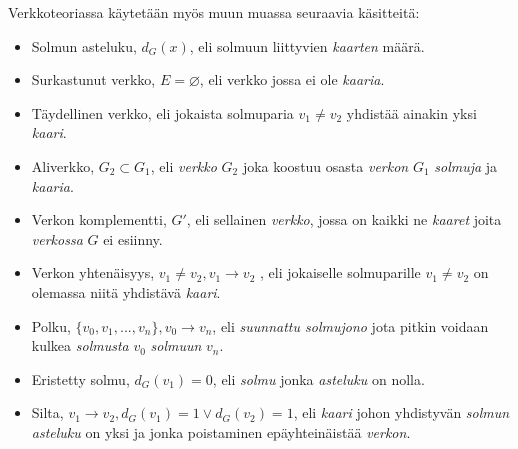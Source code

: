 Verkkoteoriassa käytetään myös muun muassa seuraavia käsitteitä:
\begin{itemize}
  \item Solmun asteluku, \(d_G(x)\), eli solmuun liittyvien \emph{kaarten} määrä.
  \item Surkastunut verkko, \(E = \varnothing \), eli verkko jossa ei ole \emph{kaaria}.
  \item Täydellinen verkko, eli jokaista solmuparia \(v_1 \neq v_2\) yhdistää ainakin yksi \emph{kaari}.
  \item Aliverkko, \(G_2 \subset G_1\), eli \emph{verkko} \(G_2\) joka koostuu osasta \emph{verkon} \(G_1\) \emph{solmuja} ja \emph{kaaria}.
  \item Verkon komplementti, \(G'\), eli sellainen \emph{verkko}, jossa on kaikki ne \emph{kaaret} joita \emph{verkossa} \(G\) ei esiinny.
  \item Verkon yhtenäisyys, \(v_1 \neq v_2, v_1 \rightarrow v_2\) , eli jokaiselle solmuparille \(v_1 \neq v_2\) on olemassa niitä yhdistävä \emph{kaari}.
  \item Polku, \(\{v_0, v_1, ..., v_n\}, v_0 \rightarrow v_n\), eli \emph{suunnattu solmujono} jota pitkin voidaan kulkea \emph{solmusta} \(v_0\) \emph{solmuun} \(v_n\).
  \item Eristetty solmu, \(d_G(v_1) = 0\), eli \emph{solmu} jonka \emph{asteluku} on nolla.
  \item Silta, \(v_1 \rightarrow v_2, d_G(v_1) = 1 \lor d_G(v_2) = 1\), eli \emph{kaari} johon yhdistyvän \emph{solmun asteluku} on yksi ja jonka poistaminen epäyhteinäistää \emph{verkon}.

\end{itemize}
